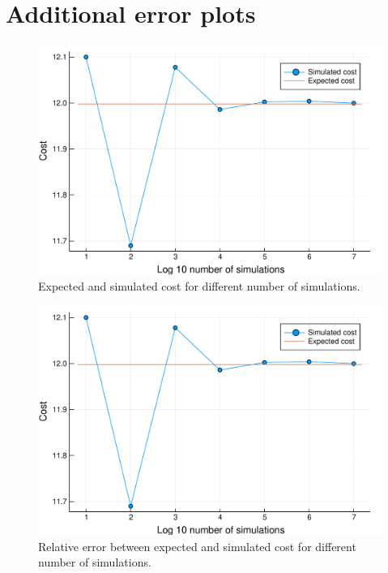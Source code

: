 \section{Additional error plots} %
\label{app:additional_error_plots}

\begin{figure}
  \begin{center}
    \includegraphics[scale=0.7]{../img/cost_iterations_log.pdf}
  \end{center}
  \caption{Expected and simulated cost for different number of simulations.}
  \label{fig:cost_iter_unif_low}
\end{figure}

\begin{figure}
  \begin{center}
    \includegraphics[scale=0.7]{../img/cost_iterations_log.pdf}
  \end{center}
  \caption{Relative error between expected and simulated cost for different number of simulations.}
  \label{fig:error_iter_unif_low}
\end{figure}

